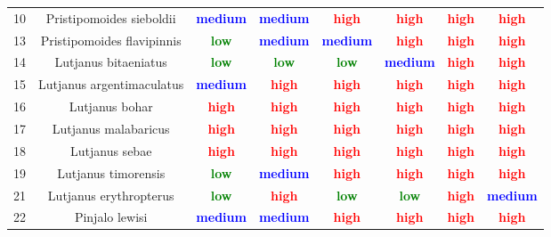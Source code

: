 \documentclass{report}\usepackage[]{graphicx}\usepackage[]{color}
\begin{document}
\begin{table}[ht]
{\begin{tabular}{cccccccc}
   10 & Pristipomoides sieboldii & \textcolor{blue}{\textbf{medium}} & \textcolor{blue}{\textbf{medium}} & \textcolor{red}{\textbf{high}} & \textcolor{red}{\textbf{high}} & \textcolor{red}{\textbf{high}} & \textcolor{red}{\textbf{high}} \\ 
   13 & Pristipomoides flavipinnis & \textcolor{green}{\textbf{low}} & \textcolor{blue}{\textbf{medium}} & \textcolor{blue}{\textbf{medium}} & \textcolor{red}{\textbf{high}} & \textcolor{red}{\textbf{high}} & \textcolor{red}{\textbf{high}} \\ 
   14 & Lutjanus bitaeniatus & \textcolor{green}{\textbf{low}} & \textcolor{green}{\textbf{low}} & \textcolor{green}{\textbf{low}} & \textcolor{blue}{\textbf{medium}} & \textcolor{red}{\textbf{high}} & \textcolor{red}{\textbf{high}} \\ 
   15 & Lutjanus argentimaculatus & \textcolor{blue}{\textbf{medium}} & \textcolor{red}{\textbf{high}} & \textcolor{red}{\textbf{high}} & \textcolor{red}{\textbf{high}} & \textcolor{red}{\textbf{high}} & \textcolor{red}{\textbf{high}} \\ 
   16 & Lutjanus bohar & \textcolor{red}{\textbf{high}} & \textcolor{red}{\textbf{high}} & \textcolor{red}{\textbf{high}} & \textcolor{red}{\textbf{high}} & \textcolor{red}{\textbf{high}} & \textcolor{red}{\textbf{high}} \\ 
   17 & Lutjanus malabaricus & \textcolor{red}{\textbf{high}} & \textcolor{red}{\textbf{high}} & \textcolor{red}{\textbf{high}} & \textcolor{red}{\textbf{high}} & \textcolor{red}{\textbf{high}} & \textcolor{red}{\textbf{high}} \\ 
   18 & Lutjanus sebae & \textcolor{red}{\textbf{high}} & \textcolor{red}{\textbf{high}} & \textcolor{red}{\textbf{high}} & \textcolor{red}{\textbf{high}} & \textcolor{red}{\textbf{high}} & \textcolor{red}{\textbf{high}} \\ 
   19 & Lutjanus timorensis & \textcolor{green}{\textbf{low}} & \textcolor{blue}{\textbf{medium}} & \textcolor{red}{\textbf{high}} & \textcolor{red}{\textbf{high}} & \textcolor{red}{\textbf{high}} & \textcolor{red}{\textbf{high}} \\ 
   21 & Lutjanus erythropterus & \textcolor{green}{\textbf{low}} & \textcolor{red}{\textbf{high}} & \textcolor{green}{\textbf{low}} & \textcolor{green}{\textbf{low}} & \textcolor{red}{\textbf{high}} & \textcolor{blue}{\textbf{medium}} \\ 
   22 & Pinjalo lewisi & \textcolor{blue}{\textbf{medium}} & \textcolor{blue}{\textbf{medium}} & \textcolor{red}{\textbf{high}} & \textcolor{red}{\textbf{high}} & \textcolor{red}{\textbf{high}} & \textcolor{red}{\textbf{high}} \\ 

\end{tabular}}
\end{table}
\end{document}
